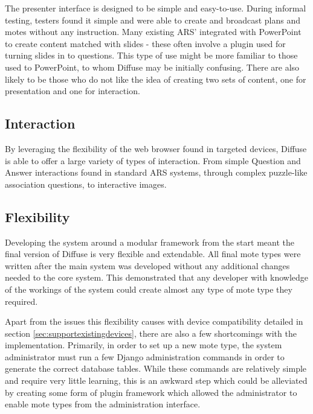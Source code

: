 \documentclass[a4papert,11pt,notitlepage]{ltxdoc}
\begin{document}
The presenter interface is designed to be simple and easy-to-use. During informal testing, testers found it simple and were able to create and broadcast plans and motes without any instruction. Many existing ARS' integrated with PowerPoint to create content matched with slides - these often involve a plugin used for turning slides in to questions. This type of use might be more familiar to those used to PowerPoint, to whom Diffuse may be initially confusing. There are also likely to be those who do not like the idea of creating two sets of content, one for presentation and one for interaction.

\subsection{Interaction}
By leveraging the flexibility of the web browser found in targeted devices, Diffuse is able to offer a large variety of types of interaction. From simple Question and Answer interactions found in standard ARS systems, through complex puzzle-like association questions, to interactive images.


\subsection{Flexibility}
Developing the system around a modular framework from the start meant the final version of Diffuse is very flexible and extendable. All final mote types were written after the main system was developed without any additional changes needed to the core system. This demonstrated that any developer with knowledge of the workings of the system could create almost any type of mote type they required.

Apart from the issues this flexibility causes with device compatibility detailed in section \ref{sec:supportexistingdevices}, there are also a few shortcomings with the implementation. Primarily, in order to set up a new mote type, the system administrator must run a few Django administration commands in order to generate the correct database tables. While these commands are relatively simple and require very little learning, this is an awkward step which could be alleviated by creating some form of plugin framework which allowed the administrator to enable mote types from the administration interface. 














\end{document}
